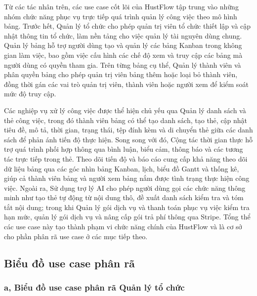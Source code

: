 \documentclass[../DoAn.tex]{subfiles}
\begin{document}
Từ các tác nhân trên, các use case cốt lõi của HustFlow tập trung vào những nhóm chức năng phục vụ trực tiếp quá trình quản lý công việc theo mô hình bảng. Trước hết, Quản lý tổ chức cho phép quản trị viên tổ chức thiết lập và cập nhật thông tin tổ chức, làm nền tảng cho việc quản lý tài nguyên dùng chung. Quản lý bảng hỗ trợ người dùng tạo và quản lý các bảng Kanban trong không gian làm việc, bao gồm việc cấu hình các chế độ xem và truy cập các bảng mà người dùng có quyền tham gia. Trên từng bảng cụ thể, Quản lý thành viên và phân quyền bảng cho phép quản trị viên bảng thêm hoặc loại bỏ thành viên, đồng thời gán các vai trò quản trị viên, thành viên hoặc người xem để kiểm soát mức độ truy cập.

Các nghiệp vụ xử lý công việc được thể hiện chủ yếu qua Quản lý danh sách và thẻ công việc, trong đó thành viên bảng có thể tạo danh sách, tạo thẻ, cập nhật tiêu đề, mô tả, thời gian, trạng thái, tệp đính kèm và di chuyển thẻ giữa các danh sách để phản ánh tiến độ thực hiện. Song song với đó, Cộng tác thời gian thực hỗ trợ quá trình phối hợp thông qua bình luận, biểu cảm, thông báo và các tương tác trực tiếp trong thẻ. Theo dõi tiến độ và báo cáo cung cấp khả năng theo dõi dữ liệu bảng qua các góc nhìn bảng Kanban, lịch, biểu đồ Gantt và thống kê, giúp cả thành viên bảng và người xem bảng nắm được tình trạng thực hiện công việc. Ngoài ra, Sử dụng trợ lý AI cho phép người dùng gọi các chức năng thông minh như tạo thẻ tự động từ nội dung thô, đề xuất danh sách kiểm tra và tóm tắt nội dung; trong khi Quản lý gói dịch vụ và thanh toán phục vụ việc kiểm tra hạn mức, quản lý gói dịch vụ và nâng cấp gói trả phí thông qua Stripe. Tổng thể các use case này tạo thành phạm vi chức năng chính của HustFlow và là cơ sở cho phần phân rã use case ở các mục tiếp theo.

\subsection{Biểu đồ use case phân rã}
\label{subsection:2.2.2}

\subsubsection*{a, Biểu đồ use case phân rã Quản lý tổ chức}
\end{document}
